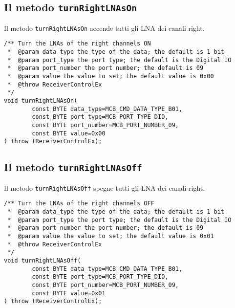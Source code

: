\subsection{Il metodo \texttt{turnRightLNAsOn}}
Il metodo \texttt{turnRightLNAsOn} accende tutti gli LNA dei canali right.
\lstset{language=C++}
\begin{lstlisting}[caption={Dichiarazione del metodo \texttt{turnRightLNAsOn}},
label=lst:turnRightLNAsOn,mathescape]
/** Turn the LNAs of the right channels ON
 *  @param data_type the type of the data; the default is 1 bit
 *  @param port_type the port type; the default is the Digital IO
 *  @param port_number the port number; the default is 09
 *  @param value the value to set; the default value is 0x00
 *  @throw ReceiverControlEx
 */
void turnRightLNAsOn(
        const BYTE data_type=MCB_CMD_DATA_TYPE_B01,
        const BYTE port_type=MCB_PORT_TYPE_DIO,
        const BYTE port_number=MCB_PORT_NUMBER_09,
        const BYTE value=0x00 
) throw (ReceiverControlEx);
\end{lstlisting}
\lstset{numbers=none}


\subsection{Il metodo \texttt{turnRightLNAsOff}}
Il metodo \texttt{turnRightLNAsOff} spegne tutti gli LNA dei canali right.
\lstset{language=C++}
\begin{lstlisting}[caption={Dichiarazione del metodo \texttt{turnRightLNAsOff}},
label=lst:turnRightLNAsOff,mathescape]
/** Turn the LNAs of the right channels OFF
 *  @param data_type the type of the data; the default is 1 bit
 *  @param port_type the port type; the default is the Digital IO
 *  @param port_number the port number; the default is 09
 *  @param value the value to set; the default value is 0x01
 *  @throw ReceiverControlEx
 */
void turnRightLNAsOff(
        const BYTE data_type=MCB_CMD_DATA_TYPE_B01,
        const BYTE port_type=MCB_PORT_TYPE_DIO,
        const BYTE port_number=MCB_PORT_NUMBER_09,
        const BYTE value=0x01
) throw (ReceiverControlEx);
\end{lstlisting}
\lstset{numbers=none}

